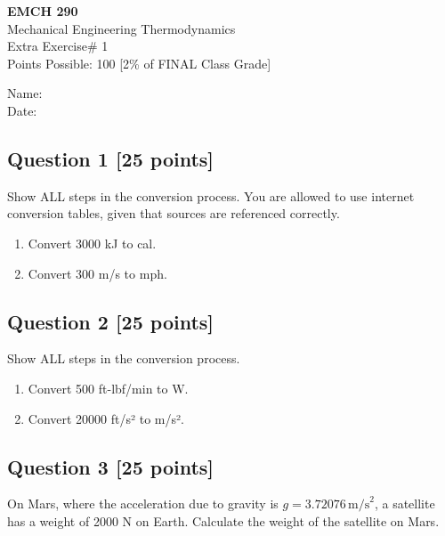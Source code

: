 \documentclass[12pt]{article}
\begin{document}
\begin{center}
\vspace*{-0.5in} %
{\Large \textbf{EMCH 290}}\\
{\large Mechanical Engineering Thermodynamics}\\
{\large Extra Exercise\# 1}\\
\vspace{0.2in}
{ Points Possible: 100 [2\% of FINAL Class Grade]}
\end{center}

\noindent Name: \underline{\hspace{4in}} \\
\vspace{0.3in}
\noindent Date: \underline{\hspace{2in}} 

\vspace{-0.3in}
\subsection*{Question 1 [25 points]}
Show ALL steps in the conversion process. You are allowed to use internet conversion tables, given that sources are referenced correctly.
\begin{enumerate}
    \item Convert 3000 kJ to cal. 
    \item Convert 300 m/s to mph.
\end{enumerate}

\newpage %

\pagestyle{fancy} %

\subsection*{Question 2 [25 points]}
Show ALL steps in the conversion process. 
\begin{enumerate}
    \item Convert 500 ft-lbf/min to W.
    \item Convert 20000 ft/s² to m/s².
\end{enumerate}
\newpage

\subsection*{Question 3 [25 points]}
On Mars, where the acceleration due to gravity is \( g = 3.72076 \, \text{m/s}^2 \), a satellite has a weight of 2000 N on Earth. Calculate the weight of the satellite on Mars.
\newpage
\end{document}
